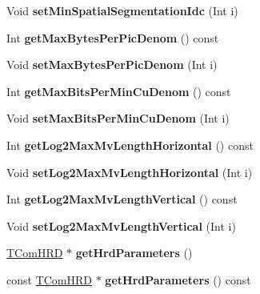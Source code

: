 \begin{DoxyCompactItemize}
Void {\bfseries set\+Min\+Spatial\+Segmentation\+Idc} (Int i)
\item 
\mbox{\label{class_t_com_v_u_i_a9fd0e0289b596ac7a1e6f8528addef12}} 
Int {\bfseries get\+Max\+Bytes\+Per\+Pic\+Denom} () const
\item 
\mbox{\label{class_t_com_v_u_i_ab25099c6ca4f7bbc31171f1a420cef00}} 
Void {\bfseries set\+Max\+Bytes\+Per\+Pic\+Denom} (Int i)
\item 
\mbox{\label{class_t_com_v_u_i_a7560c67fa942a8f1d600d52814d4fb8e}} 
Int {\bfseries get\+Max\+Bits\+Per\+Min\+Cu\+Denom} () const
\item 
\mbox{\label{class_t_com_v_u_i_a3059f7c1f87f944b35fd2d55f78f83d0}} 
Void {\bfseries set\+Max\+Bits\+Per\+Min\+Cu\+Denom} (Int i)
\item 
\mbox{\label{class_t_com_v_u_i_a1df0790cdbde88557bd91a46e391914f}} 
Int {\bfseries get\+Log2\+Max\+Mv\+Length\+Horizontal} () const
\item 
\mbox{\label{class_t_com_v_u_i_ad20625860efc21bf1a7009d5f7d16260}} 
Void {\bfseries set\+Log2\+Max\+Mv\+Length\+Horizontal} (Int i)
\item 
\mbox{\label{class_t_com_v_u_i_acc03b8fba033d8dd5a46bb45a3a0e668}} 
Int {\bfseries get\+Log2\+Max\+Mv\+Length\+Vertical} () const
\item 
\mbox{\label{class_t_com_v_u_i_a5214d26cf47e17f08465f03f267ec2c8}} 
Void {\bfseries set\+Log2\+Max\+Mv\+Length\+Vertical} (Int i)
\item 
\mbox{\label{class_t_com_v_u_i_ab89e48f68d6cb54ff055735ea0446a78}} 
\hyperlink{class_t_com_h_r_d}{T\+Com\+H\+RD} $\ast$ {\bfseries get\+Hrd\+Parameters} ()
\item 
\mbox{\label{class_t_com_v_u_i_a72ef2bdb05f32e4c939c3cfb1dfb3ddc}} 
const \hyperlink{class_t_com_h_r_d}{T\+Com\+H\+RD} $\ast$ {\bfseries get\+Hrd\+Parameters} () const
\item 
\mbox{\label{class_t_com_v_u_i_a9efd71be63373811bab6aa741681b1e4}} 

\end{DoxyCompactItemize}

